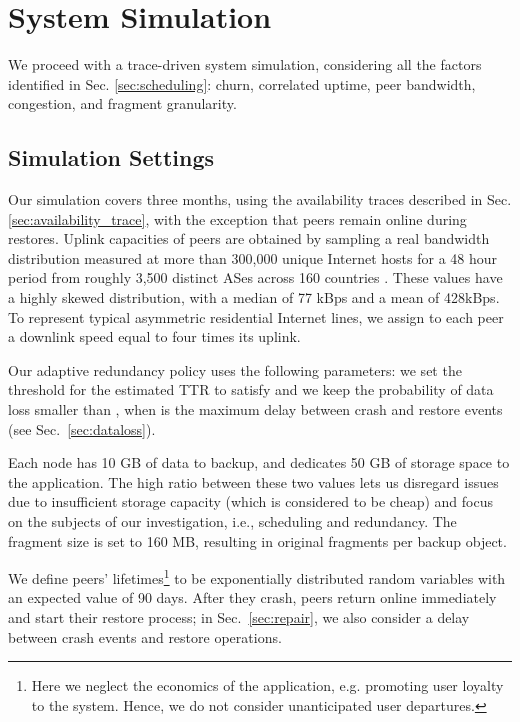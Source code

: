 \documentclass[conference,10pt]{IEEEtran}
\begin{document}
\section{System Simulation}
\label{sec:complex_sim}

We proceed with a trace-driven system simulation, considering all the factors identified in Sec. \ref{sec:scheduling}: churn, correlated uptime, peer bandwidth, congestion, and fragment granularity.

\subsection{Simulation Settings}

Our simulation covers three months, using the availability
traces described in Sec. \ref{sec:availability_trace}, with the
exception that peers remain online during restores. Uplink capacities
of peers are obtained by sampling a real bandwidth distribution
measured at more than 300,000 unique Internet hosts for a 48 hour
period from roughly 3,500 distinct ASes across 160
countries \cite{Piatek07doincentives}. These values have a highly
skewed distribution, with a median of 77 kBps and a mean of
428kBps. To represent typical asymmetric residential Internet lines,
we assign to each peer a downlink speed equal to four times its
uplink.

Our adaptive redundancy policy uses the following parameters: we set the threshold for the estimated TTR to satisfy  and we keep the probability of data loss smaller than , when  is the maximum delay between crash and restore events (see Sec.~\ref{sec:dataloss}).

Each node has 10 GB of data to backup, and dedicates 50 GB of storage space
to the application. The high ratio between these two values
lets us disregard issues due to insufficient storage capacity (which
is considered to be cheap) and focus on the subjects of our
investigation, i.e., scheduling and redundancy. The fragment size 
is set to 160 MB, resulting in  original fragments per backup
object.


We define peers' lifetimes\footnote{Here we neglect the economics of the application, e.g. promoting user loyalty to the system. Hence, we do not consider unanticipated user departures.} to be exponentially distributed random variables with an expected value of 90 days. After they crash, peers return online immediately and start their restore process; in Sec.~\ref{sec:repair}, we also consider a delay between crash events and restore operations.
\end{document}
